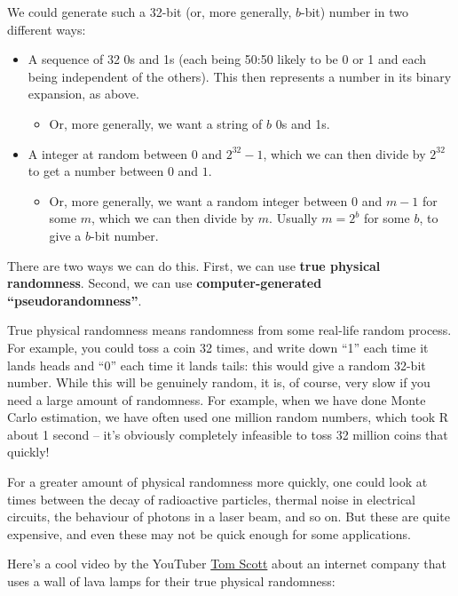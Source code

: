 \documentclass[
  letterpaper,
  DIV=11,
  numbers=noendperiod]{scrreprt}
\providecommand{\tightlist}{%
  \setlength{\itemsep}{0pt}\setlength{\parskip}{0pt}}\usepackage{longtable,booktabs,array}
\theoremstyle{plain}
\theoremstyle{definition}
\theoremstyle{definition}
\theoremstyle{remark}
\begin{document}
We could generate such a 32-bit (or, more generally, \(b\)-bit) number
in two different ways:

\begin{itemize}
\tightlist
\item
  A sequence of 32 0s and 1s (each being 50:50 likely to be 0 or 1 and
  each being independent of the others). This then represents a number
  in its binary expansion, as above.

  \begin{itemize}
  \tightlist
  \item
    Or, more generally, we want a string of \(b\) 0s and 1s.
  \end{itemize}
\item
  A integer at random between \(0\) and \(2^{32} - 1\), which we can
  then divide by \(2^{32}\) to get a number between \(0\) and \(1\).

  \begin{itemize}
  \tightlist
  \item
    Or, more generally, we want a random integer between \(0\) and
    \(m - 1\) for some \(m\), which we can then divide by \(m\). Usually
    \(m = 2^b\) for some \(b\), to give a \(b\)-bit number.
  \end{itemize}
\end{itemize}

There are two ways we can do this. First, we can use \textbf{true
physical randomness}. Second, we can use \textbf{computer-generated
``pseudorandomness''}.

True physical randomness means randomness from some real-life random
process. For example, you could toss a coin 32 times, and write down
``1'' each time it lands heads and ``0'' each time it lands tails: this
would give a random 32-bit number. While this will be genuinely random,
it is, of course, very slow if you need a large amount of randomness.
For example, when we have done Monte Carlo estimation, we have often
used one million random numbers, which took R about 1 second -- it's
obviously completely infeasible to toss 32 million coins that quickly!

For a greater amount of physical randomness more quickly, one could look
at times between the decay of radioactive particles, thermal noise in
electrical circuits, the behaviour of photons in a laser beam, and so
on. But these are quite expensive, and even these may not be quick
enough for some applications.

Here's a cool video by the YouTuber
\href{https://www.youtube.com/@TomScottGo}{Tom Scott} about an internet
company that uses a wall of lava lamps for their true physical
randomness:
\end{document}
